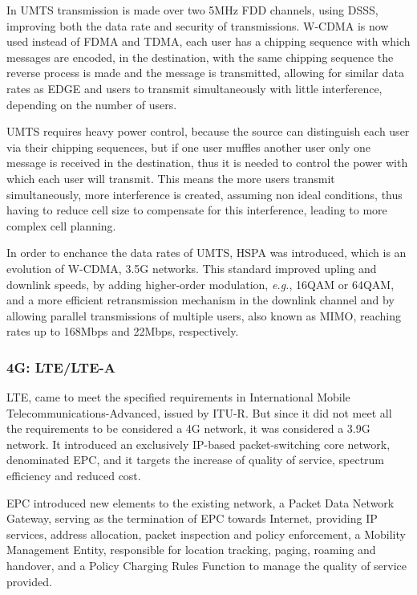 In \gls{UMTS} transmission is made over two 5MHz \gls{FDD} channels, using \gls{DSSS}, improving both the data rate and security of transmissions. \gls{W-CDMA} is now used instead of \gls{FDMA} and \gls{TDMA}, each user has a chipping sequence with which messages are encoded, in the destination, with the same chipping sequence the reverse process is made and the message is transmitted, allowing for similar data rates as \gls{EDGE} and users to transmit simultaneously with little interference, depending on the number of users.

\gls{UMTS} requires heavy power control, because the source can distinguish each user via their chipping sequences, but if one user muffles another user only one message is received in the destination, thus it is needed to control the power with which each user will transmit. This means the more users transmit simultaneously, more interference is created, assuming non ideal conditions, thus having to reduce cell size to compensate for this interference, leading to more complex cell planning.

In order to enchance the data rates of \gls{UMTS}, \gls{HSPA} was introduced, which is an evolution of \gls{W-CDMA}, 3.5G networks. This standard improved upling and downlink speeds, by adding higher-order modulation, \textit{e.g.}, 16QAM or 64QAM, and a more efficient retransmission mechanism in the downlink channel and by allowing parallel transmissions of multiple users, also known as \gls{MIMO}, reaching rates up to 168Mbps and 22Mbps, respectively.

\subsubsection{4G: LTE/LTE-A}

\gls{LTE}, came to meet the specified requirements in International Mobile Telecommunications-Advanced, issued by ITU-R. But since it did not meet all the requirements to be considered a 4G network, it was considered a 3.9G network. It introduced an exclusively IP-based packet-switching core network, denominated \gls{EPC}, and it targets the increase of quality of service, spectrum efficiency and reduced cost.

\gls{EPC} introduced new elements to the existing network, a Packet Data Network Gateway, serving as the termination of \gls{EPC} towards Internet, providing \gls{IP} services, address allocation, packet inspection and policy enforcement, a Mobility Management Entity, responsible for location tracking, paging, roaming and handover, and a Policy Charging Rules Function to manage the quality of service provided.

